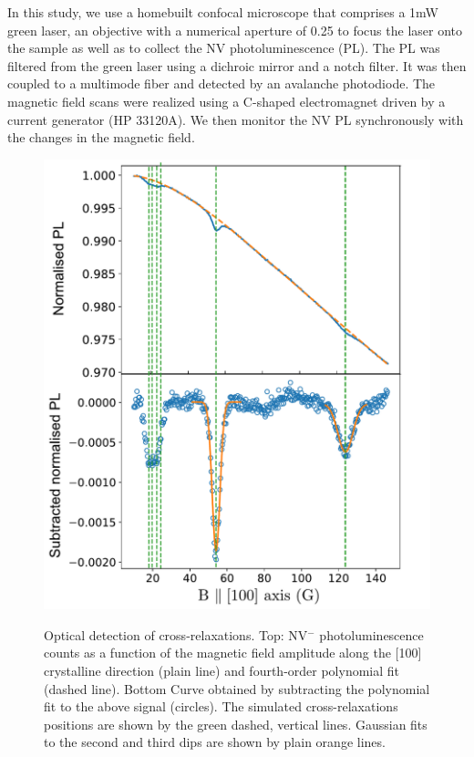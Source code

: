 \documentclass[9pt,twocolumn,twoside]{revtex4-1}
\begin{document}
In this study, we use a homebuilt confocal microscope that comprises a 1mW green laser, an objective with a numerical aperture of 0.25 to focus the laser onto the sample as well as to collect the NV photoluminescence (PL). The PL was filtered from the green laser using a dichroic mirror and a notch filter. It was then coupled to a multimode fiber and detected by an avalanche photodiode. The magnetic field scans were realized using a C-shaped electromagnet driven by a current generator (HP 33120A).  We then monitor the NV PL synchronously with the changes in the magnetic field.
\begin{figure}[ht]
\centering
{\includegraphics[width=\linewidth]{Scans_fig4}}
\caption{Optical detection of cross-relaxations. {Top}: NV$^-$ photoluminescence counts as a function of the magnetic field amplitude along the [100] crystalline direction (plain line) and fourth-order polynomial fit (dashed line). {Bottom} Curve obtained by subtracting the polynomial fit to the above signal (circles). The simulated cross-relaxations positions are shown by the green dashed, vertical lines. Gaussian fits to the second and third dips are shown by plain orange lines.}
\label{scan}
\end{figure}
\end{document}
